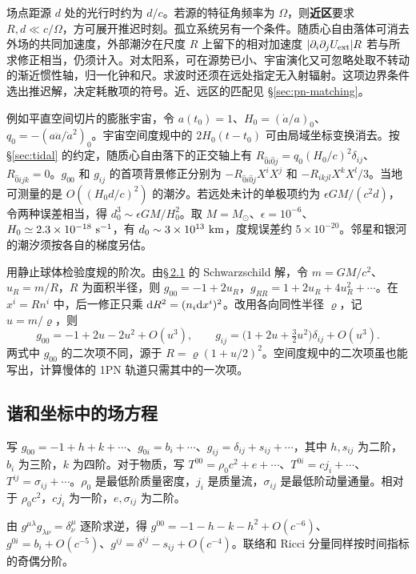 场点距源 $d$ 处的光行时约为 $d/c$。若源的特征角频率为 $\Omega$，则\textbf{近区}要求 $R,d\ll c/\Omega$，方可展开推迟时刻。孤立系统另有一个条件。随质心自由落体可消去外场的共同加速度，外部潮汐在尺度 $R$ 上留下的相对加速度 $|\partial_i\partial_jU_{\rm ext}|R$ 若与所求修正相当，仍须计入。对太阳系，可在源势已小、宇宙演化又可忽略处取不转动的渐近惯性轴，归一化钟和尺。求波时还须在远处指定无入射辐射。这项边界条件选出推迟解，决定耗散项的符号。近、远区的匹配见 \S\ref{sec:pn-matching}。

例如平直空间切片的膨胀宇宙，令 $a(t_0)=1$、$H_0=(\dot a/a)_0$、$q_0=-(a\ddot a/\dot a^2)_0$。宇宙空间度规中的 $2H_0(t-t_0)$ 可由局域坐标变换消去。按 \S\ref{sec:tidal} 的约定，随质心自由落下的正交轴上有 $R_{\hat0 i\hat0 j}=q_0(H_0/c)^2\delta_{ij}$、$R_{\hat0 ijk}=0$。$g_{00}$ 和 $g_{ij}$ 的首项背景修正分别为 $-R_{\hat0 i\hat0 j}X^iX^j$ 和 $-R_{ikjl}X^kX^l/3$。当地可测量的是 $O((H_0d/c)^2)$ 的潮汐。若远处未计的单极项约为 $\epsilon GM/(c^2d)$，令两种误差相当，得 $d_0^3\sim\epsilon GM/H_0^2$。取 $M=M_\odot$、$\epsilon=10^{-6}$、$H_0\simeq2.3\times10^{-18}\ {\rm s}^{-1}$，有 $d_0\sim3\times10^{13}\ {\rm km}$，度规误差约 $5\times10^{-20}$。邻星和银河的潮汐须按各自的梯度另估。

用静止球体检验度规的阶次。由\hyperlink{section.2.1}{\S\,2.1} 的 Schwarzschild 解，令 $m=GM/c^2$、$u_R=m/R$，$R$ 为面积半径，则 $g_{00}=-1+2u_R$，$g_{RR}=1+2u_R+4u_R^2+\cdots$。在 $x^i=Rn^i$ 中，后一修正只乘 $\dd R^2=(n_i\dd x^i)^2$。改用各向同性半径 $\varrho$，记 $u=m/\varrho$，则
\[
 g_{00}=-1+2u-2u^2+O(u^3),\qquad
 g_{ij}=\big(1+2u+\tfrac32u^2\big)\delta_{ij}+O(u^3).
\]
两式中 $g_{00}$ 的二次项不同，源于 $R=\varrho(1+u/2)^2$。空间度规中的二次项虽也能写出，计算慢体的 1PN 轨道只需其中的一次项。

\subsection{谐和坐标中的场方程}\label{sec:pn-components}

写 $g_{00}=-1+h+k+\cdots$、$g_{0i}=b_i+\cdots$、$g_{ij}=\delta_{ij}+s_{ij}+\cdots$，其中 $h,s_{ij}$ 为二阶，$b_i$ 为三阶，$k$ 为四阶。对于物质，写 $T^{00}=\rho_0c^2+e+\cdots$、$T^{0i}=cj_i+\cdots$、$T^{ij}=\sigma_{ij}+\cdots$。$\rho_0$ 是最低阶质量密度，$j_i$ 是质量流，$\sigma_{ij}$ 是最低阶动量通量。相对于 $\rho_0c^2$，$cj_i$ 为一阶，$e,\sigma_{ij}$ 为二阶。

由 $g^{\mu\lambda}g_{\lambda\nu}=\delta^\mu_\nu$ 逐阶求逆，得 $g^{00}=-1-h-k-h^2+O(c^{-6})$、$g^{0i}=b_i+O(c^{-5})$、$g^{ij}=\delta^{ij}-s_{ij}+O(c^{-4})$。联络和 Ricci 分量同样按时间指标的奇偶分阶。

